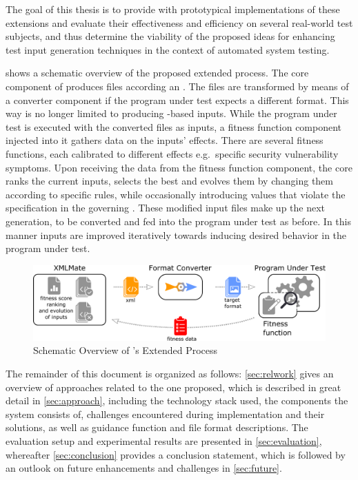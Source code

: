 The goal of this thesis is to provide \xmlmate with prototypical implementations of these extensions and
evaluate their effectiveness and efficiency on several real-world test subjects, and thus determine the
viability of the proposed ideas for enhancing test input generation techniques in the context of automated system testing.

 shows a schematic overview of the proposed extended \xmlmate process.
The core component of \xmlmate produces \xml files according an \xsd. 
The files are transformed by means of a converter component if the program under test expects a different
format. This way \xmlmate is no longer limited to producing \xml-based inputs.
While the program under test is executed with the converted files as inputs, a fitness function component
injected into it gathers data on the inputs' effects.
There are several fitness functions, each calibrated to different effects e.g.\ specific security vulnerability
symptoms. 
Upon receiving the data from the fitness function component, the \xmlmate core ranks the current inputs,
selects the best and evolves them by changing them according to specific rules, while occasionally introducing
values that violate the specification in the governing \xsd. 
These modified input files make up the next generation, to be converted and fed into the program under test as
before. 
In this manner inputs are improved iteratively towards inducing desired behavior in the program under test. 

\begin{figure}[htb]
\centering
  \includegraphics[width=\columnwidth]{overview.pdf}
  \caption{Schematic Overview of \xmlmate's Extended Process}
  \label{fig:overview}
\end{figure}

The remainder of this document is organized as follows: \cref{sec:relwork} gives an overview of approaches
related to the one proposed, which is described in great detail in \cref{sec:approach}, including the
technology stack used, the components the system consists of, challenges encountered during implementation and
their solutions, as well as guidance function and file format descriptions. The evaluation setup and
experimental results are presented in \cref{sec:evaluation}, whereafter \cref{sec:conclusion} provides a
conclusion statement, which is followed by an outlook on future enhancements and challenges in
\cref{sec:future}.
